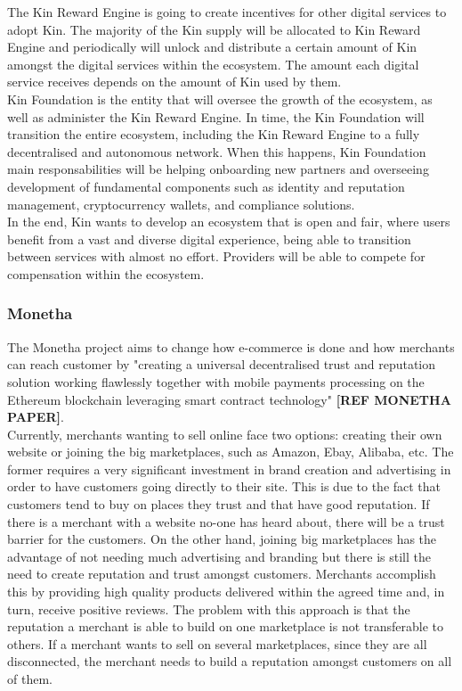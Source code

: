 The Kin Reward Engine is going to create incentives for other digital services to adopt Kin. The majority of the Kin supply will be allocated to Kin Reward Engine and periodically will unlock and distribute a certain amount of Kin amongst the digital services within the ecosystem. The amount each digital service receives depends on the amount of Kin used by them. \\

Kin Foundation is the entity that will oversee the growth of the ecosystem, as well as administer the Kin Reward Engine. In time, the Kin Foundation will transition the entire ecosystem, including the Kin Reward Engine to a fully decentralised and autonomous network. When this happens, Kin Foundation main responsabilities will be helping onboarding new partners and overseeing development of fundamental components such as identity and reputation management, cryptocurrency wallets, and compliance solutions. \\

In the end, Kin wants to develop an ecosystem that is open and fair, where users benefit from a vast and diverse digital experience, being able to transition between services with almost no effort. Providers will be able to compete for compensation within the ecosystem.

\subsubsection{Monetha}

The Monetha project aims to change how e-commerce is done and how merchants can reach customer by "creating a universal decentralised trust and reputation solution working flawlessly together with mobile payments processing on the Ethereum blockchain leveraging smart contract technology" \textbf{[REF MONETHA PAPER]}. \\

Currently, merchants wanting to sell online face two options: creating their own website or joining the big marketplaces, such as Amazon, Ebay, Alibaba, etc. The former requires a very significant investment in brand creation and advertising in order to have customers going directly to their site. This is due to the fact that customers tend to buy on places they trust and that have good reputation. If there is a merchant with a website no-one has heard about, there will be a trust barrier for the customers. On the other hand, joining big marketplaces has the advantage of not needing much advertising and branding but there is still the need to create reputation and trust amongst customers. Merchants accomplish this by providing high quality products delivered within the agreed time and, in turn, receive positive reviews. The problem with this approach is that the reputation a merchant is able to build on one marketplace is not transferable to others. If a merchant wants to sell on several marketplaces, since they are all disconnected, the merchant needs to build a reputation amongst customers on all of them.

